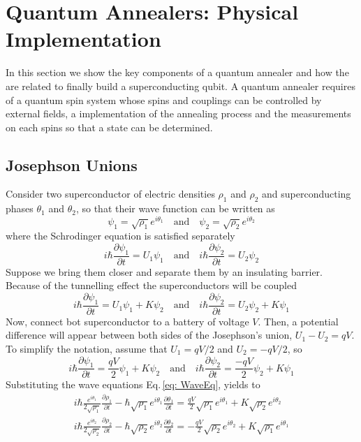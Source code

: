\section{Quantum Annealers: Physical Implementation}
In this section we show the key components of a quantum annealer and how the are related to finally build a superconducting qubit. A quantum annealer requires of a quantum spin system whose spins and couplings can be controlled by external fields, a implementation of the annealing process and the measurements on each spins so that a state can be determined.
\subsection{Josephson Unions}
Consider two superconductor of electric densities $\rho_{1}$ and $\rho_{2}$ and superconducting phases $\theta_{1}$ and $\theta_{2}$, so that their wave function can be written as
\begin{equation}
\label{eq: WaveEq}
\psi_{1}=\sqrt{\rho_{1}}e^{i\theta_{1}} \quad \text{and} \quad\psi_{2}=\sqrt{\rho_{2}}e^{i\theta_{2}}
\end{equation}
where the Schrodinger equation is satisfied separately
\begin{equation}
i\hbar\frac{\partial \psi_{1}}{\partial t}=U_{1}\psi_{1} \quad \text{and} \quad i\hbar\frac{\partial \psi_{2}}{\partial t}=U_{2}\psi_{2}
\end{equation}
Suppose we bring them closer and separate them by an insulating barrier. Because of the tunnelling effect the superconductors will be coupled
\begin{equation}
i\hbar\frac{\partial \psi_{1}}{\partial t}=U_{1}\psi_{1} + K\psi_{2} \quad \text{and} \quad i\hbar\frac{\partial \psi_{2}}{\partial t}=U_{2}\psi_{2} + K\psi_{1}
\end{equation}
Now, connect bot superconductor to a battery of voltage $V$. Then, a potential difference will appear between both sides of the Josephson's union, $U_{1} - U_{2} =qV$. To simplify the notation, assume that $U_{1} = qV/2$ and $U_{2} = -qV/2$, so
\begin{equation}
i\hbar\frac{\partial \psi_{1}}{\partial t}=\frac{qV}{2}\psi_{1} + K\psi_{2} \quad \text{and} \quad i\hbar\frac{\partial \psi_{2}}{\partial t}=\frac{-qV}{2}\psi_{2} + K\psi_{1}
\end{equation}
Substituting the wave equations Eq.\,\eqref{eq: WaveEq}, yields to
\begin{align}
i\hbar \frac{e^{i\theta_{1}}}{2\sqrt{\rho_{1}}}\frac{\partial \rho_{1}}{\partial t} - \hbar\sqrt{\rho_{1}}e^{i\theta_{1}}\frac{\partial\theta_{1}}{\partial t} = \frac{qV}{2}\sqrt{\rho_{1}}e^{i\theta_{1}} + K\sqrt{\rho_{2}}e^{i\theta_{2}} \\
i\hbar \frac{e^{i\theta_{2}}}{2\sqrt{\rho_{2}}}\frac{\partial \rho_{2}}{\partial t} - \hbar\sqrt{\rho_{2}}e^{i\theta_{2}}\frac{\partial\theta_{2}}{\partial t} = -\frac{qV}{2}\sqrt{\rho_{2}}e^{i\theta_{2}} + K\sqrt{\rho_{1}}e^{i\theta_{1}}
\end{align}
